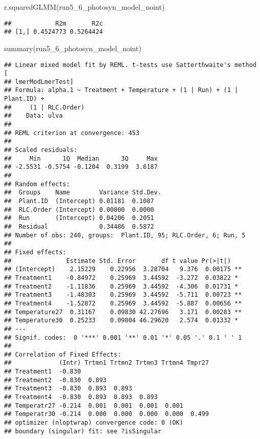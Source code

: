 \documentclass[
]{article}
\newenvironment{Shaded}{\begin{snugshade}}{\end{snugshade}}
\newcommand{\FunctionTok}[1]{\textcolor[rgb]{0.00,0.00,0.00}{#1}}
\newcommand{\NormalTok}[1]{#1}
\begin{document}
\begin{Shaded}
\begin{Highlighting}[]
\FunctionTok{r.squaredGLMM}\NormalTok{(run5\_6\_photosyn\_model\_noint)}
\end{Highlighting}
\end{Shaded}

\begin{verbatim}
##            R2m       R2c
## [1,] 0.4524773 0.5264424
\end{verbatim}

\begin{Shaded}
\begin{Highlighting}[]
\FunctionTok{summary}\NormalTok{(run5\_6\_photosyn\_model\_noint)}
\end{Highlighting}
\end{Shaded}

\begin{verbatim}
## Linear mixed model fit by REML. t-tests use Satterthwaite's method [
## lmerModLmerTest]
## Formula: alpha.1 ~ Treatment + Temperature + (1 | Run) + (1 | Plant.ID) +  
##     (1 | RLC.Order)
##    Data: ulva
## 
## REML criterion at convergence: 453
## 
## Scaled residuals: 
##     Min      1Q  Median      3Q     Max 
## -2.5531 -0.5754 -0.1204  0.3199  3.6187 
## 
## Random effects:
##  Groups    Name        Variance Std.Dev.
##  Plant.ID  (Intercept) 0.01181  0.1087  
##  RLC.Order (Intercept) 0.00000  0.0000  
##  Run       (Intercept) 0.04206  0.2051  
##  Residual              0.34486  0.5872  
## Number of obs: 240, groups:  Plant.ID, 95; RLC.Order, 6; Run, 5
## 
## Fixed effects:
##               Estimate Std. Error       df t value Pr(>|t|)   
## (Intercept)    2.15229    0.22956  3.28704   9.376  0.00175 **
## Treatment1    -0.84972    0.25969  3.44592  -3.272  0.03822 * 
## Treatment2    -1.11836    0.25969  3.44592  -4.306  0.01731 * 
## Treatment3    -1.48303    0.25969  3.44592  -5.711  0.00723 **
## Treatment4    -1.52872    0.25969  3.44592  -5.887  0.00656 **
## Temperature27  0.31167    0.09830 42.27696   3.171  0.00283 **
## Temperature30  0.25233    0.09804 46.29620   2.574  0.01332 * 
## ---
## Signif. codes:  0 '***' 0.001 '**' 0.01 '*' 0.05 '.' 0.1 ' ' 1
## 
## Correlation of Fixed Effects:
##             (Intr) Trtmn1 Trtmn2 Trtmn3 Trtmn4 Tmpr27
## Treatment1  -0.830                                   
## Treatment2  -0.830  0.893                            
## Treatment3  -0.830  0.893  0.893                     
## Treatment4  -0.830  0.893  0.893  0.893              
## Temperatr27 -0.214  0.001  0.001  0.001  0.001       
## Temperatr30 -0.214  0.000  0.000  0.000  0.000  0.499
## optimizer (nloptwrap) convergence code: 0 (OK)
## boundary (singular) fit: see ?isSingular
\end{verbatim}
\end{document}

